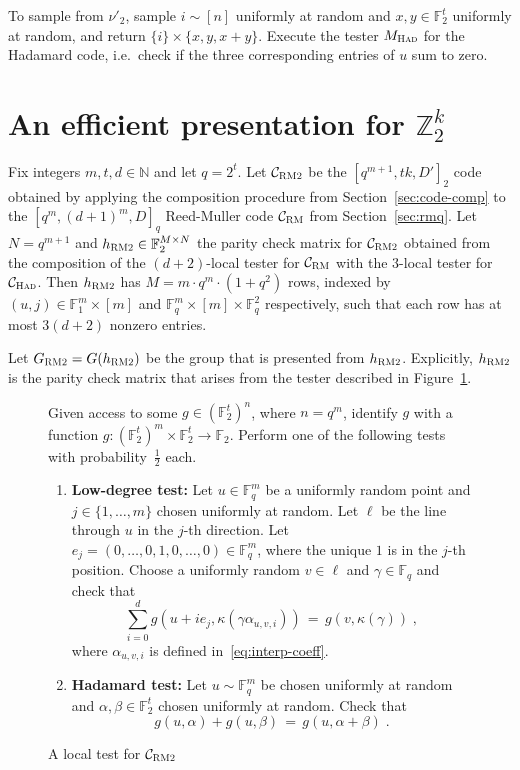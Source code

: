 \documentclass[11pt]{article}
\theoremstyle{definition}
\newcommand{\code}{\mathcal{C}}
\newcommand{\N}{\ensuremath{\mathbb{N}}}
\newcommand{\F}{\ensuremath{\mathbb{F}}}
\newcommand{\Z}{\ensuremath{\mathbb{Z}}}
\newcommand{\RM}{\ensuremath{\textsc{RM}}}
\newcommand{\bRM}{\ensuremath{\textsc{RM2}}}
\newcommand{\had}{\textsc{Had}}
\newenvironment{gamespec}{
  \begin{mdframed}[style=figstyle]}{
  \end{mdframed}}
\begin{document}
To sample from $\nu'_2$, sample $i\sim[n]$ uniformly at random and $x,y\in\F_2^t$ uniformly at random, and return $\{i\}\times\{x,y,x+y\}$. Execute the tester $M_\had$ for the Hadamard code, i.e.\ check if the three corresponding entries of $u$ sum to zero. 



\section{An efficient presentation for $\Z_2^k$}

Fix integers $m,t,d \in \N$ and let $q=2^t$. Let $\code_{\bRM}$ be the $[q^{m+1},tk,D']_2$ code obtained by applying the composition procedure from Section~\ref{sec:code-comp} to the $[q^m,(d+1)^m,D]_q$ Reed-Muller code $\code_\RM$ from Section~\ref{sec:rmq}. Let $N=q^{m+1}$ and $h_{\bRM}\in \F_2^{M\times N}$ the parity check matrix for $\code_{\bRM}$ obtained from the composition of the $(d+2)$-local tester for $\code_\RM$ with the $3$-local tester for $\code_\had$. Then $h_\bRM$ has $M= m\cdot q^m \cdot (1+q^2)$ rows, indexed by $(u,j)\in \F_1^m\times [m]$ and $\F_q^m\times [m] \times \F_q^2$ respectively, such that each row has at most $3(d+2)$ nonzero entries. 

Let $G_\bRM = G(h_\bRM)$ be the group that is presented from $h_\bRM$. Explicitly, $h_\bRM$ is the parity check matrix that arises from the tester described in Figure~\ref{fig:bRM-tester}. 


\begin{figure}[!htbp]
  \centering
  \begin{gamespec}
Given access to some $g\in (\F_2^t)^n$, where $n=q^m$, identify $g$ with a function $g:(\F_2^t)^m \times \F_2^t \to \F_2$. Perform one of the following tests with probability~$\tfrac{1}{2}$ each. 
\begin{enumerate}
	\item \textbf{Low-degree test:}
		Let $u \in \F_q^m$ be a uniformly random point and $j\in \{1,\ldots,m\}$ chosen uniformly at random. Let $\ell$ be the line through $u$ in the $j$-th direction. Let $e_j=(0,\ldots,0,1,0,\ldots,0)\in \F_q^m$, where the unique $1$ is in the $j$-th position. Choose a uniformly random $v\in \ell$ and $\gamma\in \F_q$ and check that 
		\[\sum_{i=0}^d g(u+ie_j,\kappa(\gamma \alpha_{u,v,i})) \,=\, g(v,\kappa(\gamma))\;,\]
		where $\alpha_{u,v,i}$ is defined in~\eqref{eq:interp-coeff}.
	\item \textbf{Hadamard test:} Let $u\sim\F_q^m$ be chosen uniformly at random and $\alpha,\beta\in \F_2^t$ chosen uniformly at random. Check that 
	\[g(u,\alpha)+g(u,\beta)\,=\,g(u,\alpha+\beta)\;.\] 	
    \end{enumerate}
  \end{gamespec}
  \caption{A local test for $\code_{\bRM}$}
  \label{fig:bRM-tester}
\end{figure}
\end{document}
